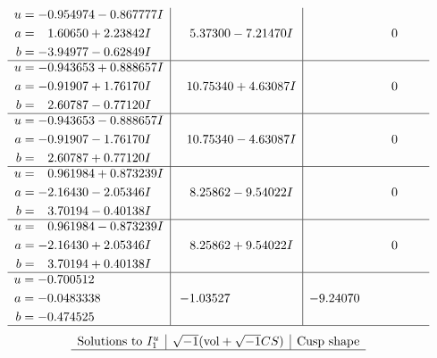 \documentclass[1p]{elsarticle_modified}
\theoremstyle{definition}
\newcommand{\I}{\sqrt{-1}}
\begin{document}
$$\begin{array}{c|c|c}
\begin{aligned}
u &= -0.954974 - 0.867777 I \\
a &= \phantom{-}1.60650 + 2.23842 I \\
b &= -3.94977 - 0.62849 I\end{aligned}
 & \phantom{-}5.37300 - 7.21470 I & \phantom{-0.000000 } 0 \\ \hline\begin{aligned}
u &= -0.943653 + 0.888657 I \\
a &= -0.91907 + 1.76170 I \\
b &= \phantom{-}2.60787 - 0.77120 I\end{aligned}
 & \phantom{-}10.75340 + 4.63087 I & \phantom{-0.000000 } 0 \\ \hline\begin{aligned}
u &= -0.943653 - 0.888657 I \\
a &= -0.91907 - 1.76170 I \\
b &= \phantom{-}2.60787 + 0.77120 I\end{aligned}
 & \phantom{-}10.75340 - 4.63087 I & \phantom{-0.000000 } 0 \\ \hline\begin{aligned}
u &= \phantom{-}0.961984 + 0.873239 I \\
a &= -2.16430 - 2.05346 I \\
b &= \phantom{-}3.70194 - 0.40138 I\end{aligned}
 & \phantom{-}8.25862 - 9.54022 I & \phantom{-0.000000 } 0 \\ \hline\begin{aligned}
u &= \phantom{-}0.961984 - 0.873239 I \\
a &= -2.16430 + 2.05346 I \\
b &= \phantom{-}3.70194 + 0.40138 I\end{aligned}
 & \phantom{-}8.25862 + 9.54022 I & \phantom{-0.000000 } 0 \\ \hline\begin{aligned}
u &= -0.700512\phantom{ +0.000000I} \\
a &= -0.0483338\phantom{ +0.000000I} \\
b &= -0.474525\phantom{ +0.000000I}\end{aligned}
 & -1.03527\phantom{ +0.000000I} & -9.24070\phantom{ +0.000000I}\\
 \hline 
 \end{array}$$\newpage$$\begin{array}{c|c|c}  
\text{Solutions to }I^u_{1}& \I (\text{vol} + \sqrt{-1}CS) & \text{Cusp shape}\\
 \hline 

\end{array}$$
\end{document}
